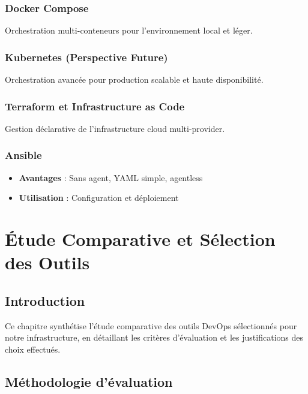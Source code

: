 \documentclass[12pt,a4paper]{report}
\begin{document}
\subsection{Docker Compose}

Orchestration multi-conteneurs pour l'environnement local et léger.

\subsection{Kubernetes (Perspective Future)}

Orchestration avancée pour production scalable et haute disponibilité.

\subsection{Terraform et Infrastructure as Code}

Gestion déclarative de l'infrastructure cloud multi-provider.

\subsection{Ansible}

\begin{itemize}
    \item \textbf{Avantages} : Sans agent, YAML simple, agentless
    \item \textbf{Utilisation} : Configuration et déploiement
\end{itemize}

\newpage

\chapter{Étude Comparative et Sélection des Outils}

\section{Introduction}

Ce chapitre synthétise l'étude comparative des outils DevOps sélectionnés pour notre infrastructure, en détaillant les critères d'évaluation et les justifications des choix effectués.

\section{Méthodologie d'évaluation}
\end{document}
